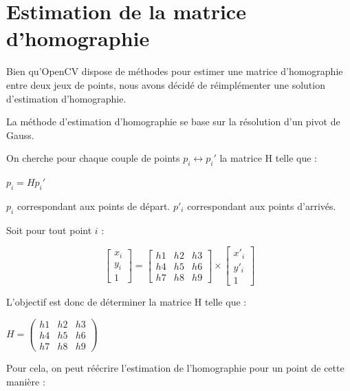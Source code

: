 \newpage
{}

    \section{Estimation de la matrice d'homographie}

    Bien qu'OpenCV dispose de méthodes pour estimer une matrice d'homographie entre deux jeux de points, nous avons décidé de réimplémenter une solution d'estimation d'homographie.

    La méthode d'estimation d'homographie se base sur la résolution d'un pivot de Gauss.

    On cherche pour chaque couple de points $p_i \leftrightarrow p_{i}' $ la matrice H telle que :

    $ p_i = Hp_i' $

    $ p_i $ correspondant aux points de départ.
    $ p'_i $ correspondant aux points d'arrivés.

    Soit pour tout point $i$ :

    \[
        \begin{bmatrix}
            x_i \\
            y_i \\
            1      
        \end{bmatrix}
        = 
        \begin{bmatrix}
            h1 &  h2 & h3 \\
            h4  & h5 & h6 \\
            h7 & h8 & h9      
        \end{bmatrix} 
        \times
        \begin{bmatrix}
            x'_i \\
            y'_i \\
            1      
        \end{bmatrix}
        \]
    
    L'objectif est donc de déterminer la matrice H telle que :

    \begin{center}
    $ H = \begin{pmatrix} h1 & h2 & h3 \\ h4 & h5 & h6 \\ h7 & h8 & h9 \end{pmatrix} $
    \end{center}

    Pour cela, on peut réécrire l'estimation de l'homographie pour un point de cette manière :

